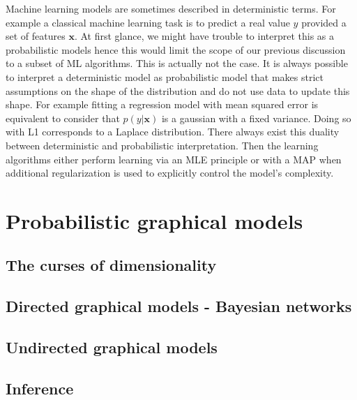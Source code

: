 Machine learning models are sometimes described in deterministic terms. For example a classical machine learning task is to predict a real value $y$ provided a set of features $\bm x$. At first glance, we might have trouble to interpret this as a probabilistic models hence this would limit the scope of our previous discussion to a subset of ML algorithms. This is actually not the case. It is always possible to interpret a deterministic model as probabilistic model that makes strict assumptions on the shape of the distribution and do not use data to update this shape. For example fitting a regression model with mean squared error is equivalent to consider that $p(y|\bm x)$ is a gaussian with a fixed variance. Doing so with L1 corresponds to a Laplace distribution. There always exist this duality between deterministic and probabilistic interpretation. Then the learning algorithms either perform learning via an MLE principle or with a MAP when additional regularization is used to explicitly control the model's complexity.



%

\section{Probabilistic graphical models}

\subsection{The curses of dimensionality}

\subsection{Directed graphical models - Bayesian networks}

\subsection{Undirected graphical models}

\subsection{Inference}

